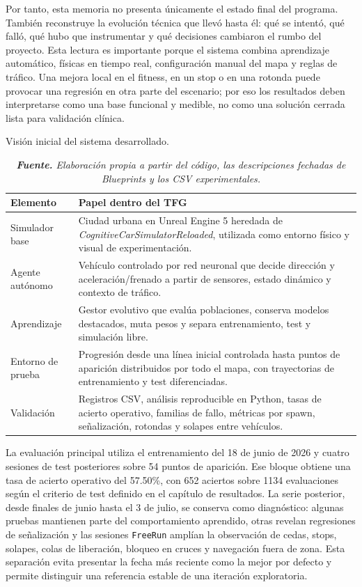 Por tanto, esta memoria no presenta únicamente el estado final del programa. También reconstruye la evolución técnica que llevó hasta él: qué se intentó, qué falló, qué hubo que instrumentar y qué decisiones cambiaron el rumbo del proyecto. Esta lectura es importante porque el sistema combina aprendizaje automático, físicas en tiempo real, configuración manual del mapa y reglas de tráfico. Una mejora local en el fitness, en un stop o en una rotonda puede provocar una regresión en otra parte del escenario; por eso los resultados deben interpretarse como una base funcional y medible, no como una solución cerrada lista para validación clínica.

\begin{table}[htbp]
\centering
\caption{Visión inicial del sistema desarrollado.}%
\label{tab:vision-inicial}
\begin{tabularx}{0.96\textwidth}{L{3.1cm}X}
\toprule
\textbf{Elemento} & \textbf{Papel dentro del TFG}\\
\midrule
Simulador base & Ciudad urbana en Unreal Engine 5 heredada de \textit{CognitiveCarSimulatorReloaded}, utilizada como entorno físico y visual de experimentación.\\
Agente autónomo & Vehículo controlado por red neuronal que decide dirección y aceleración/frenado a partir de sensores, estado dinámico y contexto de tráfico.\\
Aprendizaje & Gestor evolutivo que evalúa poblaciones, conserva modelos destacados, muta pesos y separa entrenamiento, test y simulación libre.\\
Entorno de prueba & Progresión desde una línea inicial controlada hasta puntos de aparición distribuidos por todo el mapa, con trayectorias de entrenamiento y test diferenciadas.\\
Validación & Registros CSV, análisis reproducible en Python, tasas de acierto operativo, familias de fallo, métricas por spawn, señalización, rotondas y solapes entre vehículos.\\
\bottomrule
\end{tabularx}
\caption*{\textit{\textbf{Fuente.} Elaboración propia a partir del código, las descripciones fechadas de Blueprints y los CSV experimentales.}}
\end{table}

La evaluación principal utiliza el entrenamiento del 18 de junio de 2026 y cuatro sesiones de test posteriores sobre 54 puntos de aparición. Ese bloque obtiene una tasa de acierto operativo del 57.50\%, con 652 aciertos sobre 1134 evaluaciones según el criterio de test definido en el capítulo de resultados. La serie posterior, desde finales de junio hasta el 3 de julio, se conserva como diagnóstico: algunas pruebas mantienen parte del comportamiento aprendido, otras revelan regresiones de señalización y las sesiones \texttt{FreeRun} amplían la observación de cedas, stops, solapes, colas de liberación, bloqueo en cruces y navegación fuera de zona. Esta separación evita presentar la fecha más reciente como la mejor por defecto y permite distinguir una referencia estable de una iteración exploratoria.

